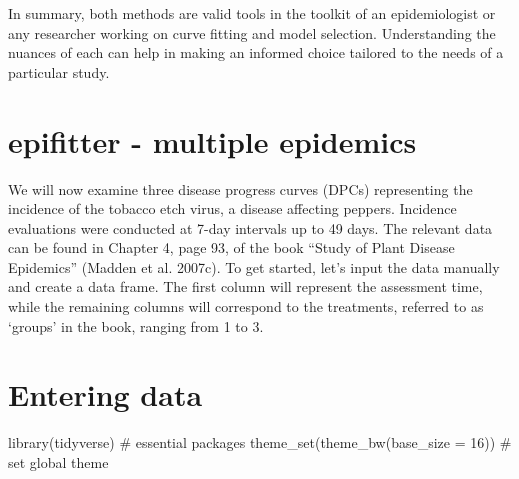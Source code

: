 \documentclass[
  letterpaper,
]{book}
\newenvironment{Shaded}{\begin{snugshade}}{\end{snugshade}}
\newcommand{\AttributeTok}[1]{\textcolor[rgb]{0.40,0.45,0.13}{#1}}
\newcommand{\CommentTok}[1]{\textcolor[rgb]{0.37,0.37,0.37}{#1}}
\newcommand{\DecValTok}[1]{\textcolor[rgb]{0.68,0.00,0.00}{#1}}
\newcommand{\FunctionTok}[1]{\textcolor[rgb]{0.28,0.35,0.67}{#1}}
\newcommand{\NormalTok}[1]{\textcolor[rgb]{0.00,0.23,0.31}{#1}}
\begin{document}
In summary, both methods are valid tools in the toolkit of an
epidemiologist or any researcher working on curve fitting and model
selection. Understanding the nuances of each can help in making an
informed choice tailored to the needs of a particular study.

\hypertarget{epifitter---multiple-epidemics}{%
\section{epifitter - multiple
epidemics}\label{epifitter---multiple-epidemics}}

We will now examine three disease progress curves (DPCs) representing
the incidence of the tobacco etch virus, a disease affecting peppers.
Incidence evaluations were conducted at 7-day intervals up to 49 days.
The relevant data can be found in Chapter 4, page 93, of the book
``Study of Plant Disease Epidemics'' (Madden et al. 2007c). To get
started, let's input the data manually and create a data frame. The
first column will represent the assessment time, while the remaining
columns will correspond to the treatments, referred to as `groups' in
the book, ranging from 1 to 3.

\hypertarget{entering-data}{%
\section{Entering data}\label{entering-data}}

\begin{Shaded}
\begin{Highlighting}[]
\FunctionTok{library}\NormalTok{(tidyverse) }\CommentTok{\# essential packages }
\FunctionTok{theme\_set}\NormalTok{(}\FunctionTok{theme\_bw}\NormalTok{(}\AttributeTok{base\_size =} \DecValTok{16}\NormalTok{)) }\CommentTok{\# set global theme}
\end{Highlighting}
\end{Shaded}
\end{document}
